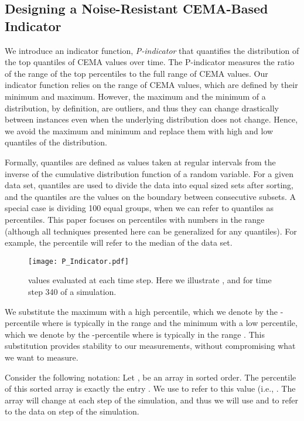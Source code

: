 \documentclass[final]{siamltex}
\newcommand{\pmetric}{P}
\begin{document}
\subsection{Designing a Noise-Resistant CEMA-Based Indicator} \label{sec:indicator}
We introduce an indicator function, \emph{\pmetric-indicator} that quantifies 
the distribution of the top quantiles of CEMA values over time. The
\pmetric-indicator measures the ratio of the range of the top percentiles  
to the full range of CEMA values. 
Our indicator function  relies on  the range of CEMA values,  which are 
defined by their minimum and maximum.  However, the maximum and the minimum of a 
distribution, by definition,  are outliers, and  thus they can change drastically  
between instances even when the underlying  distribution does not change.  Hence, 
we avoid the maximum and minimum and replace them with  high and low quantiles of 
the distribution. 

Formally, quantiles are defined as  values taken at regular intervals from the 
inverse of the cumulative distribution function of a random variable. For a given 
data set, quantiles are used to divide the data into equal sized sets  after sorting, 
and the quantiles are the values on the boundary between consecutive subsets.  A special 
case is dividing 100 equal groups, when we can refer to quantiles as
percentiles.  This paper focuses on percentiles with numbers in the  
range (although all techniques presented here can be generalized for any
quantiles). For example, the  percentile will refer to the median of the data set. 
\begin{figure}[H]
\centering
\texttt{[image: P\_Indicator.pdf]}
\caption{\label{fig:p_indicator} 
   values evaluated at each time step. 
  Here we illustrate ,  and  for
  time step 340 of a simulation.
}
\end{figure}
 
We substitute the maximum with a high percentile, which we denote by the 
-percentile where  is typically in the range  and the 
minimum with a low percentile, which we denote by the -percentile where 
 is typically in the range . This substitution provides  
stability to our measurements,  without compromising what we want to measure. 
 
Consider the following notation: Let , be an array in sorted order.
The  percentile of this sorted array is exactly the entry . 
We use  to refer to this value (i.e.,  .  
The  array  will change at each step of  the simulation, and thus we will use  and  
 to refer to the data  on step  of the simulation. 
\end{document}
